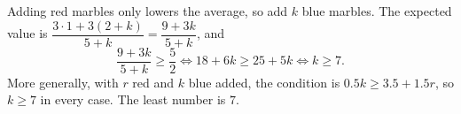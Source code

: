 Adding red marbles only lowers the average, so add $k$ blue marbles. The expected value is $\dfrac{3\cdot1+3(2+k)}{5+k}=\dfrac{9+3k}{5+k}$, and
\[\dfrac{9+3k}{5+k}\ge\dfrac52\iff18+6k\ge25+5k\iff k\ge7.\]
More generally, with $r$ red and $k$ blue added, the condition is $0.5k\ge3.5+1.5r$, so $k\ge7$ in every case. The least number is $\boxed{7}$.
